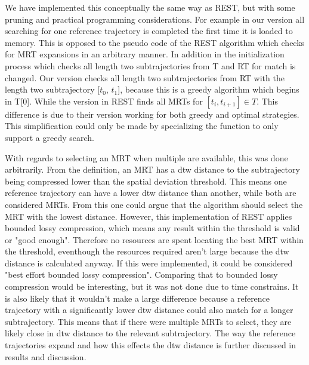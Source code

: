 We have implemented this conceptually the same way as REST, but with some pruning and practical programming considerations. For example in our version all searching for one reference trajectory is completed the first time it is loaded to memory. This is opposed to the pseudo code of the REST algorithm which checks for MRT expansions in an arbitrary manner. In addition in the initialization process which checks all length two subtrajectories from T and RT for match is changed. Our version checks all length two subtrajectories from RT with the length two subtrajectory [$t_0$, $t_1$], because this is a greedy algorithm which begins in T[0]. While the version in REST finds all MRTs for $[t_i, t_{i+1}] \in T$. This difference is due to their version working for both greedy and optimal strategies. This simplification could only be made by specializing the function to only support a greedy search.

With regards to selecting an MRT when multiple are available, this was done arbitrarily. From the definition, an MRT has a dtw distance to the subtrajectory being compressed lower than the spatial deviation threshold. This means one reference trajectory can have a lower dtw distance than another, while both are considered MRTs. From this one could argue that the algorithm should select the MRT with the lowest distance. However, this implementation of REST applies bounded lossy compression, which means any result within the threshold is valid or "good enough". Therefore no resources are spent locating the best MRT within the threshold, eventhough the resources required aren't large because the dtw distance is calculated anyway. If this were implemented, it could be considered "best effort bounded lossy compression". Comparing that to bounded lossy compression would be interesting, but it was not done due to time constrains. It is also likely that it wouldn't make a large difference because a reference trajectory with a significantly lower dtw distance could also match for a longer subtrajectory. This means that if there were multiple MRTs to select, they are likely close in dtw distance to the relevant subtrajectory. The way the reference trajectories expand and how this effects the dtw distance is further discussed in results and discussion. %

